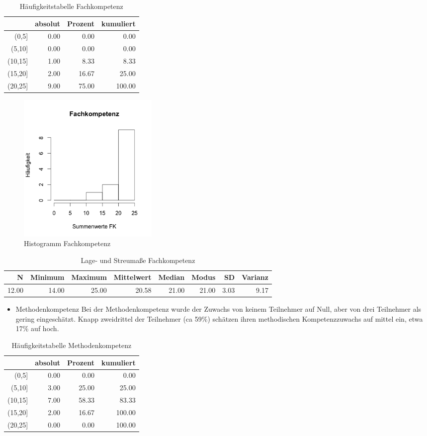 \documentclass[12pt, bibliography=totoc]{scrartcl}
\begin{document}
\begin{table}[H]
\centering
\caption{Häufigkeitstabelle Fachkompetenz}
\begin{tabular}{rrrr}
  \hline
 & absolut & Prozent & kumuliert \\
  \hline
(0,5] & 0.00 & 0.00 & 0.00 \\
  (5,10] & 0.00 & 0.00 & 0.00 \\
  (10,15] & 1.00 & 8.33 & 8.33 \\
  (15,20] & 2.00 & 16.67 & 25.00 \\
  (20,25] & 9.00 & 75.00 & 100.00 \\
   \hline
\end{tabular}
\end{table}\begin{figure}[H]
\centering
\includegraphics[width=0.33\textwidth]{Anhang/FKHist.png}
\caption{Histogramm Fachkompetenz}
\end{figure}

\begin{table}[H]
\centering
\caption{Lage- und Streumaße Fachkompetenz}
\begin{tabular}{rrrrrrrr}
  \hline
  N & Minimum & Maximum & Mittelwert & Median & Modus & SD & Varianz \\
  \hline
 12.00 & 14.00 & 25.00 & 20.58 & 21.00 & 21.00 & 3.03 & 9.17 \\
   \hline
\end{tabular}
\end{table}

\begin{itemize}
\tightlist
\item
  Methodenkompetenz Bei der Methodenkompetenz wurde der Zuwachs von
  keinem Teilnehmer auf Null, aber von drei Teilnehmer als gering
  eingeschätzt. Knapp zweidrittel der Teilnehmer (ca 59\%) schätzen
  ihren methodischen Kompetenzzuwachs auf mittel ein, etwa 17\% auf
  hoch.
\end{itemize}

\begin{table}
\centering
\caption{Häufigkeitstabelle Methodenkompetenz}
\begin{tabular}{rrrr}
  \hline
 & absolut & Prozent & kumuliert \\
  \hline
(0,5] & 0.00 & 0.00 & 0.00 \\
  (5,10] & 3.00 & 25.00 & 25.00 \\
  (10,15] & 7.00 & 58.33 & 83.33 \\
  (15,20] & 2.00 & 16.67 & 100.00 \\
  (20,25] & 0.00 & 0.00 & 100.00 \\
   \hline
\end{tabular}
\end{table}
\end{document}
